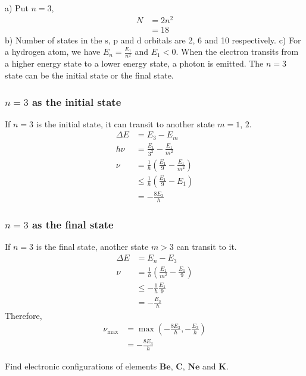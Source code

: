 \documentclass[12pt]{book} %
\numberwithin{equation}{chapter}
\def\D{\Delta}
\begin{document}
\begin{solbox}
a) Put $n=3$,
\begin{align*}
N&=2n^{2}\\
&=18
\end{align*}
b) Number of states in the $\text{s}$, $\text{p}$ and $\text{d}$ orbitals are 2, 6 and 10 respectively.\bigskip\newline
c) For a hydrogen atom, we have $E_{n}=\frac{E_{1}}{n^{2}}$ and $E_{1}<0$. When the electron transits from a higher energy state to a lower energy state, a photon is emitted. The $n=3$ state can be the initial state or the final state.

\subsubsection*{$n=3$ as the initial state}
If $n=3$ is the initial state, it can transit to another state $m=1$, $2$.
\begin{align*}
\D E&=E_{3}-E_{m}\\
h\nu&=\frac{E_{1}}{3^{2}}-\frac{E_{1}}{m^{2}}\\
\nu&=\frac{1}{h}\left(\frac{E_{1}}{9}-\frac{E_{1}}{m^{2}}\right)\\
&\leq\frac{1}{h}\left(\frac{E_{1}}{9}-E_{1}\right)\\
&=-\frac{8E_{3}}{h}
\end{align*}

\subsubsection*{$n=3$ as the final state}
If $n=3$ is the final state, another state $m>3$ can transit to it.
\begin{align*}
\D E&=E_{n}-E_{3}\\
\nu&=\frac{1}{h}\left(\frac{E_{1}}{m^{2}}-\frac{E_{1}}{9}\right)\\
&\leq-\frac{1}{h}\frac{E_{1}}{9}\\
&=-\frac{E_{3}}{h}
\end{align*}
Therefore,
\begin{align*}
\nu_{\text{max}}&=\max\left(-\frac{8E_{3}}{h}, -\frac{E_{3}}{h}\right)\\
&=-\frac{8E_{3}}{h}
\end{align*}
\end{solbox}

\begin{problem}
Find electronic configurations of elements $\mathbf{Be}$, $\mathbf{C}$, $\mathbf{Ne}$ and $\mathbf{K}$.
\end{problem}
\end{document}
